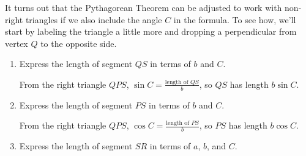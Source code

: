 \documentclass{article}
\begin{document}
\begin{enumerate}
  
  It turns out that the Pythagorean Theorem can be adjusted to work with non-right triangles if we also include the angle $C$ in the formula.  To see how, we'll start by
  labeling the triangle a little more and dropping a perpendicular from
  vertex $Q$ to the opposite side.


  \begin{enumerate}[resume]
  \item
    \begin{problem}[\vfill]
      Express the length of segment $QS$ in terms of $b$ and $C$.  
    \end{problem}

    \begin{solution}
      From the right triangle $QPS$, $\sin C = \frac{\text{length of
        } QS}{b}$, so $QS$ has length $\boxed{b \sin C}$.
    \end{solution}

  \item
    \begin{problem}[\vfill\newpage]
      Express the length of segment $PS$ in terms of $b$ and $C$. 
    \end{problem}

    \begin{solution}
      From the right triangle $QPS$, $\cos C = \frac{\text{length of
        } PS}{b}$, so $PS$ has length $\boxed{b \cos C}$.
    \end{solution}

  \item
    \begin{problem}[\vfill]
      Express the length of segment $SR$ in terms of $a$, $b$, and $C$. 
    \end{problem}


\end{enumerate}
\end{enumerate}
\end{document}
